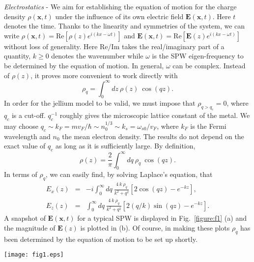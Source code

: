 \documentclass[aps,reprint]{revtex4-1}
\begin{document}
\textit{Electrostatics} - We aim for establishing the equation of motion for the charge density $\rho(\mathbf{x},t)$ under the influence of its own electric field $\mathbf{E}(\mathbf{x},t)$. Here $t$ denotes the time. Thanks to the linearity and symmetries of the system, we can write $\rho(\mathbf{x},t) = \mbox{Re}\left[\rho(z)e^{i(kx-\omega t)}\right]$ and $\mathbf{E}(\mathbf{x},t) = \mbox{Re}\left[\mathbf{E}(z)e^{i(kx-\omega t)}\right]$ without loss of generality. Here Re/Im takes the real/imaginary part of a quantity, $k\geq 0$ denotes the wavenumber while $\omega$ is the SPW eigen-frequency to be determined by the equation of motion. In general, $\omega$ can be complex. Instead of $\rho(z)$, it proves more convenient to work directly with $$\rho_q = \int^{\infty}_0 dz~\rho(z)~\cos(qz).$$ In order for the jellium model to be valid, we must impose that $\rho_{q>q_c}=0$, where $q_c$ is a cut-off. $q^{-1}_c$ roughly gives the microscopic lattice constant of the metal. We may choose $q_c \sim k_F = mv_F/\hbar\sim n^{1/3}_0\sim k_s = \omega_{s0}/v_F$, where $k_F$ is the Fermi wavelength and $n_0$ the mean electron density. The results do not depend on the exact value of $q_c$ as long as it is sufficiently large. By definition, $$\rho(z) = \frac{2}{\pi} \int^{\infty}_0 dq ~ \rho_q~\cos(qz).$$ In terms of $\rho_q$, we can easily find, by solving Laplace's equation, that
\begin{eqnarray}
E_x(z) &=& -i\int^{\infty}_0dq~\frac{4~k~\rho_q}{k^2+q^2}\left[2\cos(qz)-e^{-kz}\right], \label{ex}\\
E_z(z) &=& \int^{\infty}_0dq~\frac{4~k~\rho_q}{k^2+q^2}\left[2(q/k)\sin(qz)-e^{-kz}\right].\label{ez} 
\end{eqnarray}
A snapshot of $\mathbf{E}(\mathbf{x},t)$ for a typical SPW is displayed in Fig.~\ref{figure:f1} (a) and the magnitude of $\mathbf{E}(z)$ is plotted in (b). Of course, in making these plots $\rho_q$ has been determined by the equation of motion to be set up shortly. 

\begin{figure*}
\begin{center}
\texttt{[image: fig1.eps]}
\end{center}
\caption{Sketch of SPWs supported on the surface of a semi-infinite metal. $k/k_s=0.1$ and $p=1$. (a) Charge density map (color) and electric field map (arrows). (b) Plots of $\rho(z)$ and $E_{\mu}(z)$, where $\mu=x,z$. $\rho(z)$ is calculated by Eq.~(\ref{rho}) while $E_{\mu}(z)$ by (\ref{ex}) and (\ref{ez}). Both $\rho(z)$ and $E_{\mu}(z)$ have been normalized. \label{figure:f1}}
\end{figure*} 
\end{document}

